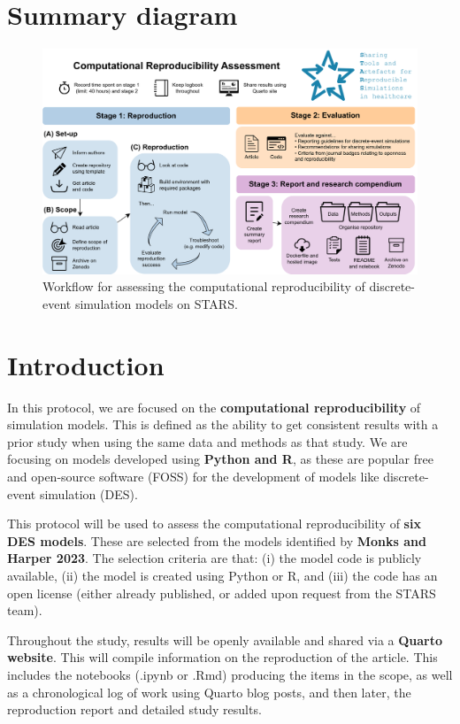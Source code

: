 \section{Summary diagram}

\begin{figure}[!htb]
    \includegraphics[width=1\linewidth]{images/stars_wp1_workflow.png}
    \caption{Workflow for assessing the computational reproducibility of discrete-event simulation models on STARS.}
\end{figure}

\newpage
\section{Introduction}

In this protocol, we are focused on the \textbf{computational reproducibility} of simulation models. This is defined as the ability to get consistent results with a prior study when using  the same data and methods as that study. We are focusing on models developed using \textbf{Python and R}, as these are popular free and open-source software (FOSS) for the development of models like discrete-event simulation (DES).\autocite{monks_computer_2023}

This protocol will be used to assess the computational reproducibility of \textbf{six DES models}. These are selected from the models identified by \textbf{Monks and Harper 2023}.\autocite{monks_computer_2023} The selection criteria are that: (i) the model code is publicly available, (ii) the model is created using Python or R, and (iii) the code has an open license (either already published, or added upon request from the STARS team).

Throughout the study, results will be openly available and shared via a \textbf{Quarto website}. This will compile information on the reproduction of the article. This includes the notebooks (.ipynb or .Rmd) producing the items in the scope, as well as a chronological log of work using Quarto blog posts, and then later, the reproduction report and detailed study results.

